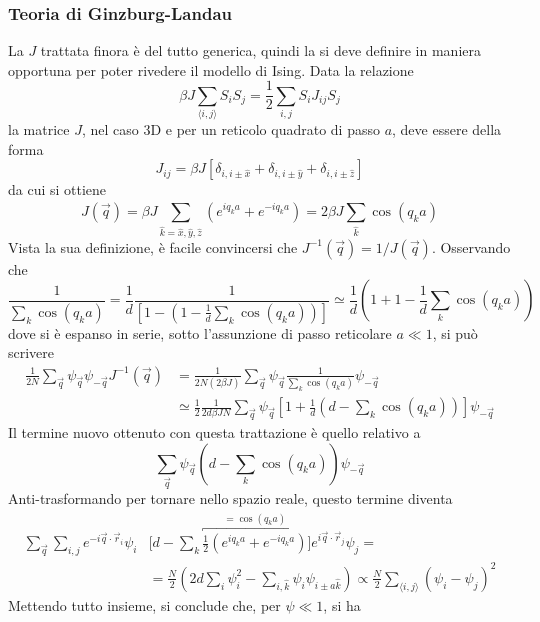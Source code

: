 \documentclass[11pt, a4paper]{scrartcl}
\theoremstyle{style}
\theoremstyle{style1}
\numberwithin{equation}{subsection}
\begin{document}
\subsubsection{Teoria di Ginzburg-Landau}
La $J$ trattata finora \`e del tutto generica, quindi la si deve definire in maniera opportuna per poter rivedere il modello di Ising.
Data la relazione 
\[
\beta J \sum_{\langle i,j \rangle}^{} S_i S_j = \frac{1}{2}\sum_{i,j}^{} S_i J_{ij} S_j
\] 
la matrice $J$, nel caso 3D e per un reticolo quadrato di passo $a$, deve essere della forma
\[
J_{ij}  = \beta J \left[ \delta _{i,i\pm \hat{x}} + \delta _{i , i\pm \hat{y}} + \delta _{i,i\pm \hat{z}} \right] 
\] 
da cui si ottiene 
\[
J(\vec{q}) = \beta J \sum_{\hat{k}=\hat{x},\hat{y},\hat{z}}^{} \left(e^{iq_k a} + e^{-iq_k a}\right) = 2\beta J \sum_{\hat{k}}^{} \cos (q_k a)
\] 
Vista la sua definizione, \`e facile convincersi che $J^{-1}(\vec{q}) = 1 / J(\vec{q})$.
Osservando che
\[
		\frac{1}{\sum_{k}^{} \cos(q_ka)} =  \frac{1}{d} \frac{1}{\left[ 1-\left(1-\frac{1}{d}\sum_{k}^{} \cos(q_ka)\right)  \right] } \simeq \frac{1}{d}\left(1+1 -\frac{1}{d}\sum_{k}^{} \cos(q_ka)\right) 
\] 
dove si \`e espanso in serie, sotto l'assunzione di passo reticolare $a \ll 1$, si pu\`o scrivere 
\[
	\begin{split}
		\frac{1}{2N} \sum_{\vec{q}}^{} \psi _{\vec{q}} \psi _{-\vec{q}} J^{-1}(\vec{q})&= \frac{1}{2N(2\beta J)} \sum_{\vec{q}}^{} \psi _{\vec{q}} \frac{1}{\sum_{k}^{} \cos(q_ka)}\psi _{-\vec{q}} \\
											       &\simeq \frac{1}{2} \frac{1}{2d \beta JN} \sum_{\vec{q}}^{} \psi _{\vec{q}} \left[1 + \frac{1}{d}\left(d - \sum_{k}^{} \cos(q_ka)\right) \right] \psi _{-\vec{q}} 
	\end{split}
\] 
Il termine nuovo ottenuto con questa trattazione \`e quello relativo a 
\[
\sum_{\vec{q}}^{} \psi _{\vec{q}} \left(d - \sum_{k}^{} \cos(q_ka)\right) \psi _{-\vec{q}} 
\] 
Anti-trasformando per tornare nello spazio reale, questo termine diventa
\[
	\begin{split}
		\sum_{\vec{q}}^{} \sum_{i,j}^{} e^{-i \vec{q}\cdot \vec{r}_i}\psi _i &\Bigg[d - \sum_{k}^{} \overbracket{\frac{1}{2}\left(e^{i q_k a} + e^{-i q_ka}\right)}^{= \cos (q_ka)}  \Bigg] e^{i \vec{q}\cdot \vec{r}_j}\psi _j =\\
		&= \frac{N}{2} \left(2d \sum_{i}^{} \psi _i^2 - \sum_{i,\hat{k}}^{} \psi _i \psi _{i \pm a \hat{k}} \right) \propto \frac{N}{2} \sum_{\langle i,j \rangle}^{} \left(\psi _i - \psi _j\right) ^2
	\end{split}
\] 
Mettendo tutto insieme, si conclude che, per $\psi \ll 1$, si ha
\end{document}
